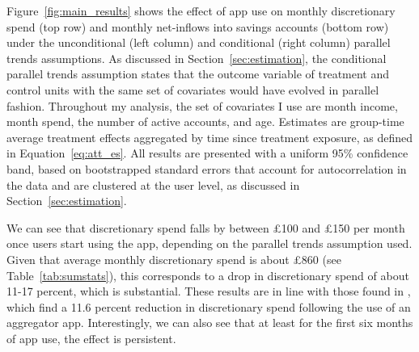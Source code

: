Figure~\ref{fig:main_results} shows the effect of app use on monthly
discretionary spend (top row) and monthly net-inflows into savings accounts
(bottom row) under the unconditional (left column) and conditional (right
column) parallel trends assumptions. As discussed in
Section~\ref{sec:estimation}, the conditional parallel trends assumption states
that the outcome variable of treatment and control units with the same set of
covariates would have evolved in parallel fashion. Throughout my analysis, the
set of covariates I use are month income, month spend, the number of active
accounts, and age. Estimates are group-time average treatment effects
aggregated by time since treatment exposure, as defined in
Equation~\ref{eq:att_es}. All results are presented with a uniform 95\%
confidence band, based on bootstrapped standard errors that account for
autocorrelation in the data and are clustered at the user level, as discussed
in Section~\ref{sec:estimation}.

We can see that discretionary spend falls by between \pounds100 and \pounds150
per month once users start using the app, depending on the parallel trends
assumption used. Given that average monthly discretionary spend is about
\pounds860 (see Table~\ref{tab:sumstats}), this corresponds to a drop in
discretionary spend of about 11-17 percent, which is substantial. These results
are in line with those found in \citet{levi2020mind}, which find a 11.6 percent
reduction in discretionary spend following the use of an aggregator app.
Interestingly, we can also see that at least for the first six months of app
use, the effect is persistent.

